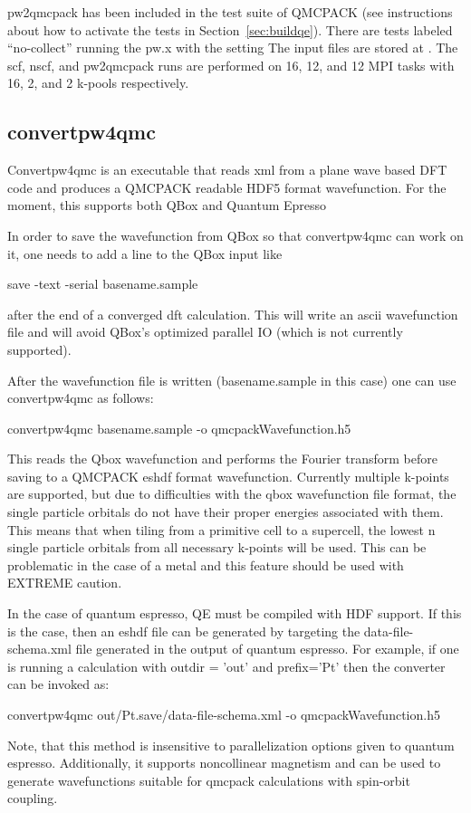 pw2qmcpack has been included in the test suite of QMCPACK (see instructions about how to activate the tests in Section~\ref{sec:buildqe}).
There are tests labeled ``no-collect'' running the pw.x with the setting 
The input files are stored at .
The scf, nscf, and pw2qmcpack runs are performed on 16, 12, and 12 MPI tasks with 16, 2, and 2 k-pools respectively.
\subsection{convertpw4qmc}
Convertpw4qmc is an executable that reads xml from a plane wave based DFT code and produces a QMCPACK readable 
HDF5 format wavefunction.  For the moment, this supports both QBox and Quantum Epresso

In order to save the wavefunction from QBox so that convertpw4qmc can work on it, one needs to add a line to the
QBox input like
\begin{shade}
save -text -serial basename.sample
\end{shade}
after the end of a converged dft calculation.  This will write an ascii wavefunction file and will avoid
QBox's optimized parallel IO (which is not currently supported).

After the wavefunction file is written (basename.sample in this case) one can use convertpw4qmc as follows:
\begin{shade}
convertpw4qmc basename.sample -o qmcpackWavefunction.h5
\end{shade}

This reads the Qbox wavefunction and performs the Fourier transform before saving to a QMCPACK eshdf format wavefunction.  Currently multiple k-points are supported, but due to difficulties with the qbox wavefunction file format, the single particle orbitals do not have their proper energies associated with them.  This means that when tiling from a primitive cell to a supercell, the lowest n single particle orbitals from all necessary k-points will be used.  This can be problematic in the case of a metal and this feature should be used with EXTREME caution.

In the case of quantum espresso, QE must be compiled with HDF support.  If this is the case, then an eshdf file can be generated by targeting the data-file-schema.xml file
generated in the output of quantum espresso.  For example, if one is running a calculation with outdir = 'out' and prefix='Pt' then the converter can be invoked as:
\begin{shade}
  convertpw4qmc out/Pt.save/data-file-schema.xml -o qmcpackWavefunction.h5
\end{shade}
Note, that this method is insensitive to parallelization options given to quantum espresso.  Additionally, it supports noncollinear magnetism and can be used to generate
wavefunctions suitable for qmcpack calculations with spin-orbit coupling.

